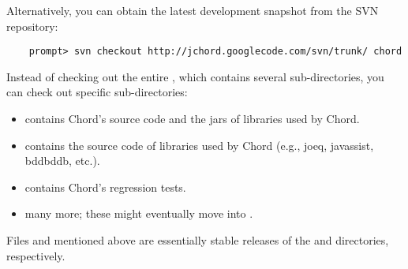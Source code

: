 \noindent Alternatively, you can obtain the latest development snapshot from the SVN repository:

\begin{verbatim}
    prompt> svn checkout http://jchord.googlecode.com/svn/trunk/ chord
\end{verbatim}

\noindent Instead of checking out the entire , which contains several sub-directories, you can check out
specific sub-directories:
\begin{itemize}
\item {} contains Chord's source code and the jars of libraries used by Chord.
\item {} contains the source code of libraries used by Chord (e.g., joeq, javassist, bddbddb, etc.).
\item {} contains Chord's regression tests.
\item many more; these might eventually move into .
\end{itemize}

\noindent Files  and  mentioned above are essentially stable releases of
the  and  directories, respectively. 

